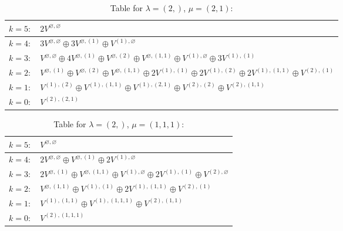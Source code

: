 \documentclass[a4paper,12pt]{article}
\begin{document}
\renewcommand{\arraystretch}{1.6} 
\begin{table}[H]
\centering
\caption{Table for $\lambda = (2,)$, $\mu = (2, 1)$:}
\begin{tabular}{|>{\centering\arraybackslash}p{15cm}|}
\hline
 $k = 5: \quad 2 V^{\varnothing, \varnothing} $ \\ \hline
 $k = 4: \quad 3 V^{\varnothing, \varnothing} \oplus 3 V^{\varnothing, (1)} \oplus V^{(1), \varnothing} $ \\ \hline
 $k = 3: \quad V^{\varnothing, \varnothing} \oplus 4 V^{\varnothing, (1)} \oplus V^{\varnothing, (2)} \oplus V^{\varnothing, (1, 1)} \oplus V^{(1), \varnothing} \oplus 3 V^{(1), (1)} $ \\ \hline
 $k = 2: \quad V^{\varnothing, (1)} \oplus V^{\varnothing, (2)} \oplus V^{\varnothing, (1, 1)} \oplus 2 V^{(1), (1)} \oplus 2 V^{(1), (2)} \oplus 2 V^{(1), (1, 1)} \oplus V^{(2), (1)} $ \\ \hline
 $k = 1: \quad V^{(1), (2)} \oplus V^{(1), (1, 1)} \oplus V^{(1), (2, 1)} \oplus V^{(2), (2)} \oplus V^{(2), (1, 1)} $ \\ \hline
 $k = 0: \quad V^{(2), (2, 1)} $ \\ \hline
\end{tabular}
\end{table}

\renewcommand{\arraystretch}{1.6} 
\begin{table}[H]
\centering
\caption{Table for $\lambda = (2,)$, $\mu = (1, 1, 1)$:}
\begin{tabular}{|>{\centering\arraybackslash}p{15cm}|}
\hline
 $k = 5: \quad V^{\varnothing, \varnothing} $ \\ \hline
 $k = 4: \quad 2 V^{\varnothing, \varnothing} \oplus V^{\varnothing, (1)} \oplus 2 V^{(1), \varnothing} $ \\ \hline
 $k = 3: \quad 2 V^{\varnothing, (1)} \oplus V^{\varnothing, (1, 1)} \oplus V^{(1), \varnothing} \oplus 2 V^{(1), (1)} \oplus V^{(2), \varnothing} $ \\ \hline
 $k = 2: \quad V^{\varnothing, (1, 1)} \oplus V^{(1), (1)} \oplus 2 V^{(1), (1, 1)} \oplus V^{(2), (1)} $ \\ \hline
 $k = 1: \quad V^{(1), (1, 1)} \oplus V^{(1), (1, 1, 1)} \oplus V^{(2), (1, 1)} $ \\ \hline
 $k = 0: \quad V^{(2), (1, 1, 1)} $ \\ \hline
\end{tabular}
\end{table}
\end{document}
